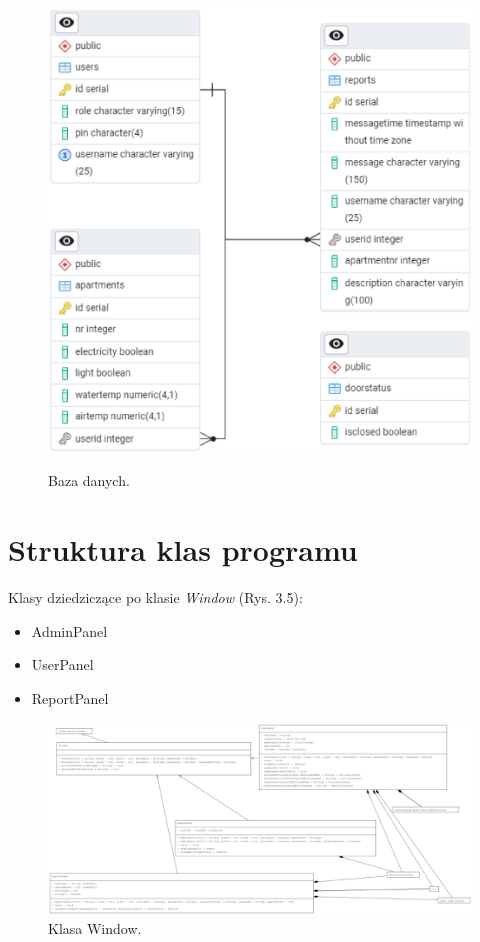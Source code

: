 \begin{figure}[H]
    \centering
    \includegraphics[width=\linewidth]{figures/database.eps}\\
    \caption{Baza danych.\label{fig4}}
\end{figure}

\newpage \section{Struktura klas programu}
\noindent Klasy dziedziczące po klasie \textit{Window} (Rys. 3.5):
\begin{itemize}
    \item AdminPanel
    \item UserPanel
    \item ReportPanel
\end{itemize}

\begin{figure}[H]
    \centering
    \includegraphics[width=\textwidth,height=1\textheight,keepaspectratio]{figures/UML/main-panels.eps}
    \caption{Klasa Window.\label{fig23}}
\end{figure}

